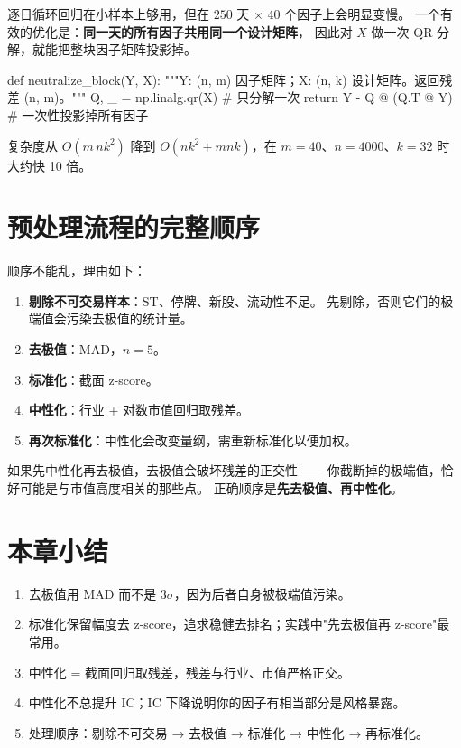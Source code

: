 逐日循环回归在小样本上够用，但在 $250$ 天 $\times$ 40 个因子上会明显变慢。
一个有效的优化是：\textbf{同一天的所有因子共用同一个设计矩阵}，
因此对 $X$ 做一次 QR 分解，就能把整块因子矩阵投影掉。

\begin{pycode}[批量残差化]
def neutralize_block(Y, X):
    """Y: (n, m) 因子矩阵；X: (n, k) 设计矩阵。返回残差 (n, m)。"""
    Q, _ = np.linalg.qr(X)        # 只分解一次
    return Y - Q @ (Q.T @ Y)      # 一次性投影掉所有因子
\end{pycode}

复杂度从 $O(m\,n k^2)$ 降到 $O(nk^2 + mnk)$，在 $m=40$、$n=4000$、$k=32$ 时
大约快 10 倍。

\section{预处理流程的完整顺序}

顺序不能乱，理由如下：

\begin{enumerate}
  \item \textbf{剔除不可交易样本}：ST、停牌、新股、流动性不足。
        先剔除，否则它们的极端值会污染去极值的统计量。
  \item \textbf{去极值}：MAD，$n=5$。
  \item \textbf{标准化}：截面 z-score。
  \item \textbf{中性化}：行业 + 对数市值回归取残差。
  \item \textbf{再次标准化}：中性化会改变量纲，需重新标准化以便加权。
\end{enumerate}

\begin{warnbox}[一个容易被忽略的顺序问题]
如果先中性化再去极值，去极值会破坏残差的正交性——
你截断掉的极端值，恰好可能是与市值高度相关的那些点。
正确顺序是\textbf{先去极值、再中性化}。
\end{warnbox}

\section{本章小结}

\begin{enumerate}
  \item 去极值用 MAD 而不是 $3\sigma$，因为后者自身被极端值污染。
  \item 标准化保留幅度去 z-score，追求稳健去排名；实践中"先去极值再 z-score"最常用。
  \item 中性化 = 截面回归取残差，残差与行业、市值严格正交。
  \item 中性化不总提升 IC；IC 下降说明你的因子有相当部分是风格暴露。
  \item 处理顺序：剔除不可交易 → 去极值 → 标准化 → 中性化 → 再标准化。
\end{enumerate}
